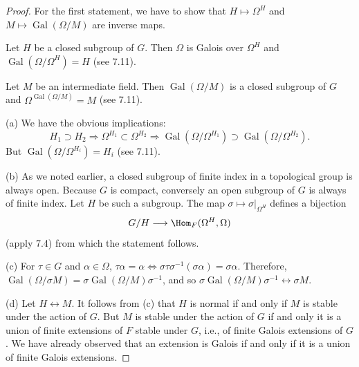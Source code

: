 \begin{proof}
For the first statement, we have to show that $H\mapsto\Omega^H$ and $M\mapsto\operatorname{Gal}(\Omega/M)$ are inverse maps.

Let $H$ be a closed subgroup of $G$. Then $\Omega$ is Galois over $\Omega^H$ and $\operatorname{Gal}(\Omega/\Omega^H)=H$ (see 7.11).

Let $M$ be an intermediate field. Then $\operatorname{Gal}(\Omega/M)$ is a closed subgroup of $G$ and $\Omega^{\operatorname{Gal}(\Omega/M)}=M$ (see 7.11).

(a) We have the obvious implications:
\[
H_1\supset H_2\Longrightarrow\Omega^{H_1}\subset\Omega^{H_2}
\Longrightarrow\operatorname{Gal}(\Omega/\Omega^{H_1})\supset\operatorname{Gal}(\Omega/\Omega^{H_2}).
\]
But $\operatorname{Gal}(\Omega/\Omega^{H_i})=H_i$ (see 7.11).

(b) As we noted earlier, a closed subgroup of finite index in a topological group is always open. Because $G$ is compact, conversely an open subgroup of $G$ is always of finite index. Let $H$ be such a subgroup. The map $\sigma\mapsto\sigma|_{\Omega^H}$ defines a bijection
\[
G/H\longrightarrow\Hom_F(\Omega^H,\Omega)
\]
(apply 7.4) from which the statement follows.

(c) For $\tau\in G$ and $\alpha\in\Omega$, $\tau\alpha=\alpha\Longleftrightarrow\sigma\tau\sigma^{-1}(\sigma\alpha)=\sigma\alpha$. Therefore, $\operatorname{Gal}(\Omega/\sigma M)=\sigma\operatorname{Gal}(\Omega/M)\sigma^{-1}$, and so $\sigma\operatorname{Gal}(\Omega/M)\sigma^{-1}\leftrightarrow\sigma M$.

(d) Let $H\leftrightarrow M$. It follows from (c) that $H$ is normal if and only if $M$ is stable under the action of $G$. But $M$ is stable under the action of $G$ if and only it is a union of finite extensions of $F$ stable under $G$, i.e., of finite Galois extensions of $G$. We have already observed that an extension is Galois if and only if it is a union of finite Galois extensions.
\end{proof}

